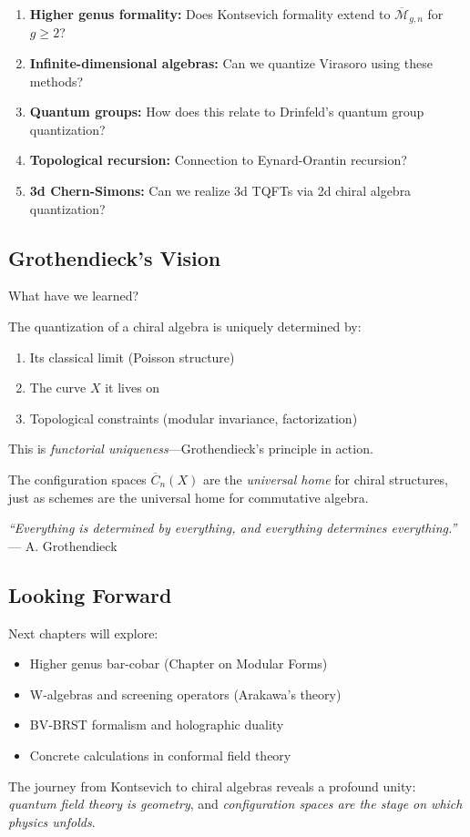 \begin{enumerate}
\item \textbf{Higher genus formality:} Does Kontsevich formality extend to $\overline{\mathcal{M}}_{g,n}$ for $g \geq 2$?

\item \textbf{Infinite-dimensional algebras:} Can we quantize Virasoro using these methods?

\item \textbf{Quantum groups:} How does this relate to Drinfeld's quantum group quantization?

\item \textbf{Topological recursion:} Connection to Eynard-Orantin recursion?

\item \textbf{3d Chern-Simons:} Can we realize 3d TQFTs via 2d chiral algebra quantization?
\end{enumerate}

\subsection{Grothendieck's Vision}

What have we learned?

The quantization of a chiral algebra is uniquely determined by:
\begin{enumerate}
\item Its classical limit (Poisson structure)
\item The curve $X$ it lives on
\item Topological constraints (modular invariance, factorization)
\end{enumerate}

This is \emph{functorial uniqueness}—Grothendieck's principle in action.

The configuration spaces $\overline{C}_n(X)$ are the \emph{universal home} for chiral structures, just as schemes are the universal home for commutative algebra.

\begin{center}
\textit{``Everything is determined by everything, and everything determines everything.''} \\
— A. Grothendieck
\end{center}

\subsection{Looking Forward}

Next chapters will explore:
\begin{itemize}
\item Higher genus bar-cobar (Chapter on Modular Forms)
\item W-algebras and screening operators (Arakawa's theory)
\item BV-BRST formalism and holographic duality
\item Concrete calculations in conformal field theory
\end{itemize}

The journey from Kontsevich to chiral algebras reveals a profound unity: \emph{quantum field theory is geometry}, and \emph{configuration spaces are the stage on which physics unfolds}.